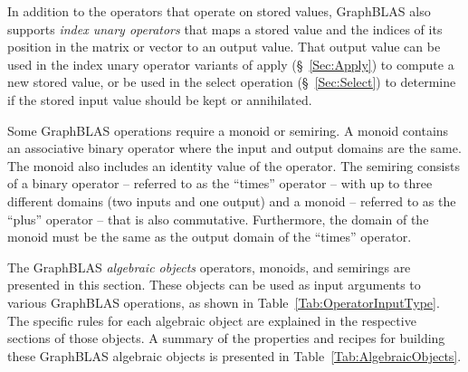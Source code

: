 In addition to the operators that operate on stored values, GraphBLAS
also supports \emph{index unary operators} that maps a stored value and 
the indices of its position in the matrix or vector to an output value.
That output value can be used in the index unary operator variants of {\sf apply} (\S~\ref{Sec:Apply}) 
to compute a new stored value, or be used in the {\sf select} operation (\S~\ref{Sec:Select}) to 
determine if the stored input value should be kept or annihilated.

Some GraphBLAS operations require a monoid or semiring.  A monoid contains an associative 
binary operator where the input and output domains are
the same. The monoid also includes an identity value of the operator.
The semiring consists of a binary operator -- referred to as the ``times'' 
operator -- with up to three different domains (two inputs
and one output) and a monoid -- referred to as the ``plus'' operator -- that
is also commutative.  Furthermore, the domain
of the monoid must be the same as the output domain of the ``times'' operator.

The GraphBLAS \emph{algebraic objects} operators, monoids, and semirings
are presented in this section.
These objects can be used as input arguments to various GraphBLAS
operations, as shown in Table~\ref{Tab:OperatorInputType}.
The specific rules for each algebraic object
are explained in the respective sections of those objects.  A summary
of the properties and recipes for building these GraphBLAS algebraic
objects is presented in Table~\ref{Tab:AlgebraicObjects}.

